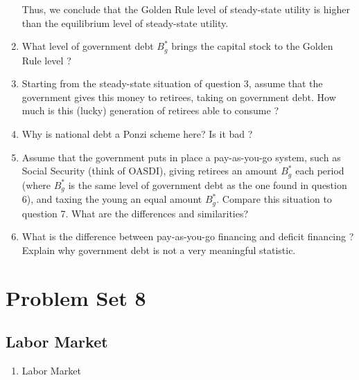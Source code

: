 \documentclass[]{book}
\providecommand{\tightlist}{%
  \setlength{\itemsep}{0pt}\setlength{\parskip}{0pt}}
\theoremstyle{definition}
\theoremstyle{definition}
\theoremstyle{definition}
\theoremstyle{remark}
\begin{document}
\begin{enumerate}
\[  \] Thus, we conclude that the Golden Rule level of steady-state
  utility is higher than the equilibrium level of steady-state utility.
\item
  What level of government debt \(B^{*}_g\) brings the capital stock to
  the Golden Rule level ?
\item
  Starting from the steady-state situation of question 3, assume that
  the government gives this money to retirees, taking on government
  debt. How much is this (lucky) generation of retirees able to consume
  ?
\item
  Why is national debt a Ponzi scheme here? Is it bad ?
\item
  Assume that the government puts in place a pay-as-you-go system, such
  as Social Security (think of OASDI), giving retirees an amount
  \(B^{*}_g\) each period (where \(B^{*}_g\) is the same level of
  government debt as the one found in question 6), and taxing the young
  an equal amount \(B^{*}_g\). Compare this situation to question 7.
  What are the differences and similarities?
\item
  What is the difference between pay-as-you-go financing and deficit
  financing ? Explain why government debt is not a very meaningful
  statistic.
\end{enumerate}

\chapter{Problem Set 8}\label{pset8}

\hypertarget{labor-market}{\section{Labor Market}\label{labor-market}}

\begin{enumerate}
\def\labelenumi{\arabic{enumi}.}
\tightlist
\item
  Labor Market
\end{enumerate}


\end{document}
